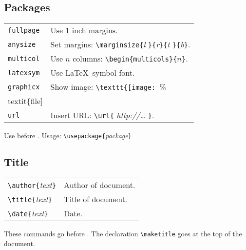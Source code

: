 \subsection{Packages}
\begin{tabular}{@{}p{\the\MyLen}%
                @{}p{\linewidth-\the\MyLen}@{}}
\texttt{fullpage}  &  Use 1 inch margins. \\
\texttt{anysize}   &  Set margins: \verb!\marginsize{!\textit{l}%
                        \verb!}{!\textit{r}\verb!}{!\textit{t}%
                        \verb!}{!\textit{b}\verb!}!.            \\
\texttt{multicol}  &  Use $n$ columns: 
                        \verb!\begin{multicols}{!$n$\verb!}!.   \\
\texttt{latexsym}  &  Use \LaTeX\ symbol font. \\
\texttt{graphicx}  &  Show image:
                        \verb!\texttt{[image: !\%
                        \\textit\{file]}\verb!}!. \\
\texttt{url}       & Insert URL: \verb!\url{!%
                        \textit{http://\ldots}%
                        \verb!}!.
\end{tabular}

Use before \verb!!. 
Usage: \verb!\usepackage{!\textit{package}\verb!}!


\subsection{Title}
\begin{tabular}{@{}p{\the\MyLen}%
                @{}p{\linewidth-\the\MyLen}@{}}
\verb!\author{!\textit{text}\verb!}! & Author of document. \\
\verb!\title{!\textit{text}\verb!}!  & Title of document. \\
\verb!\date{!\textit{text}\verb!}!   & Date. \\
\end{tabular}

These commands go before \verb!!.  The declaration
\verb!\maketitle! goes at the top of the document.

